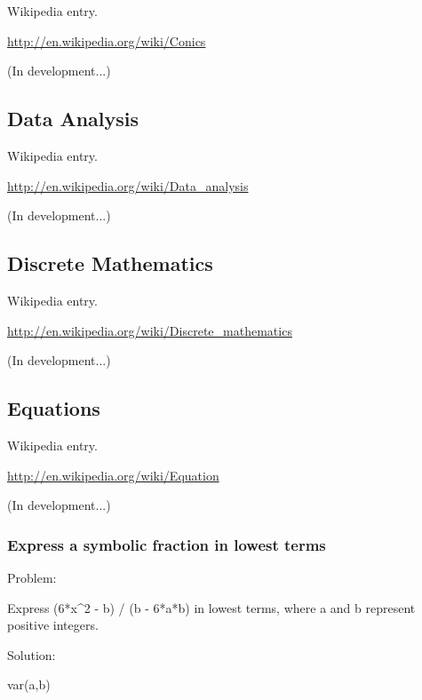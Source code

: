 \documentclass[12pt,twoside]{book}
\begin{document}
Wikipedia entry.

\href{http://en.wikipedia.org/wiki/Conics}{http://en.wikipedia.org/wiki/Conics}

(In development...)

\subsection[Data Analysis]{Data Analysis}

Wikipedia entry.

\href{http://en.wikipedia.org/wiki/Data_analysis}{http://en.wikipedia.org/wiki/Data\_analysis}

(In development...)

\subsection[Discrete Mathematics ]{Discrete Mathematics }

Wikipedia entry.

\href{http://en.wikipedia.org/wiki/Discrete_mathematics}{http://en.wikipedia.org/wiki/Discrete\_mathematics}

(In development...)

\subsection[Equations]{Equations}

Wikipedia entry.

\href{http://en.wikipedia.org/wiki/Equation}{http://en.wikipedia.org/wiki/Equation}

(In development...)

\subsubsection[Express a symbolic fraction in lowest terms]{Express a symbolic fraction in lowest terms} 

{\textquotedbl}{\textquotedbl}{\textquotedbl}

Problem:

Express (6*x\^{}2 {}- b) / (b {}- 6*a*b) in lowest terms, where a and b represent positive integers. 

\bigskip

Solution:

{\textquotedbl}{\textquotedbl}{\textquotedbl}


\bigskip

var({\textquotesingle}a,b{\textquotesingle})
\end{document}
